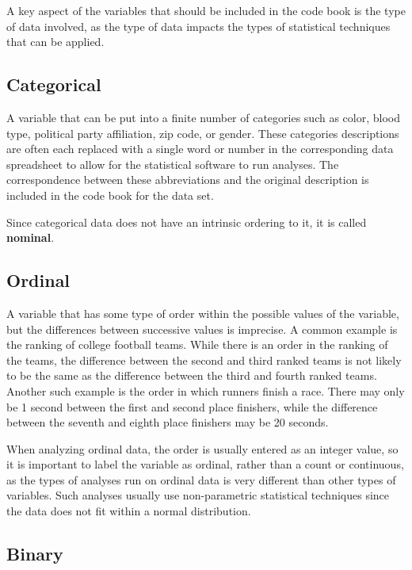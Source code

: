 \documentclass[
]{book}
\theoremstyle{definition}
\theoremstyle{definition}
\theoremstyle{definition}
\theoremstyle{definition}
\theoremstyle{remark}
\begin{document}
A key aspect of the variables that should be included in the code book is the type of data involved, as the type of data impacts the types of statistical techniques that can be applied.

\hypertarget{categorical}{%
\subsection{Categorical}\label{categorical}}

A variable that can be put into a finite number of categories such as color, blood type, political party affiliation, zip code, or gender. These categories descriptions are often each replaced with a single word or number in the corresponding data spreadsheet to allow for the statistical software to run analyses. The correspondence between these abbreviations and the original description is included in the code book for the data set.

Since categorical data does not have an intrinsic ordering to it, it is called \textbf{nominal}.

\hypertarget{ordinal}{%
\subsection{Ordinal}\label{ordinal}}

A variable that has some type of order within the possible values of the variable, but the differences between successive values is imprecise. A common example is the ranking of college football teams. While there is an order in the ranking of the teams, the difference between the second and third ranked teams is not likely to be the same as the difference between the third and fourth ranked teams. Another such example is the order in which runners finish a race. There may only be 1 second between the first and second place finishers, while the difference between the seventh and eighth place finishers may be 20 seconds.

When analyzing ordinal data, the order is usually entered as an integer value, so it is important to label the variable as ordinal, rather than a count or continuous, as the types of analyses run on ordinal data is very different than other types of variables. Such analyses usually use non-parametric statistical techniques since the data does not fit within a normal distribution.

\hypertarget{binary}{%
\subsection{Binary}\label{binary}}
\end{document}
